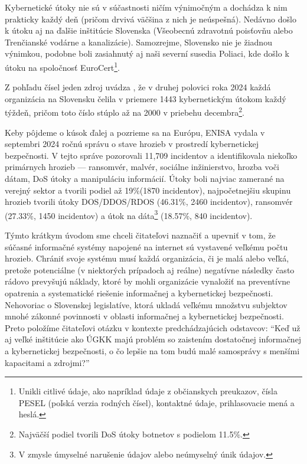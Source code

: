 Kybernetické útoky nie sú v súčastnosti ničím výnimočným a dochádza k nim prakticky každý deň (pričom drvivá väčšina z nich je neúspešná). Nedávno došlo k
útoku aj na ďalšie inštitúcie Slovenska (Všeobecnú zdravotnú poisťovňu\cite{utok_na_vszp_zive} alebo Trenčianské vodárne a kanalizácie\cite{utok_na_trencin_zive}).
Samozrejme, Slovensko nie je žiadnou výnimkou, podobne boli zasiahnutý aj naši severní susedia Poliaci, kde došlo k útoku na spoločnosť
EuroCert\cite{utok_na_polsko_zive}\cite{utok_na_polsko_eurocert}\footnote{Unikli citlivé údaje, ako napríklad údaje z občianskych preukazov, čísla PESEL
(poľská verzia rodných čísel), kontaktné údaje, prihlasovacie mená a heslá.}.

Z pohľadu čísel jeden zdroj uvádza \cite{pocet_kyberutokov_na_slovensku}, že v druhej polovici roka 2024 každá organizácia na Slovensku čelila v priemere
1443 kybernetickým útokom každý týždeň, pričom toto číslo stúplo až na 2000 v priebehu decembra\footnote{Najväčší podiel tvorili DoS útoky botnetov s
podielom 11.5\%.}. 

Keby pôjdeme o kúsok ďalej a pozrieme sa na Európu, ENISA vydala v septembri 2024 ročnú správu o stave hrozieb v prostredí kybernetickej
bezpečnosti\cite{enisa_cybersecurity_threat_landscape_2024}. V tejto správe pozorovali 11,709 incidentov a identifikovala niekoľko primárnych hrozieb ---
ransomvér, malvér, sociálne inžinierstvo, hrozba voči dátam, DoS útoky a manipuláciu informácií. Útoky boli najviac zamerané na verejný sektor a tvorili
podiel až 19\%(1870 incidentov), najpočetnejšiu skupinu hrozieb tvorili útoky DOS/DDOS/RDOS (46.31\%, 2460 incidentov), ransomvér (27.33\%, 1450 incidentov)
a útok na dáta\footnote{V zmysle úmyselné narušenie údajov alebo neúmyselný únik údajov.} (18.57\%, 840 incidentov).

Týmto krátkym úvodom sme chceli čitateľovi naznačiť a upevniť v tom, že súčasné informačné systémy napojené na internet sú vystavené veľkému počtu hrozieb.
Chrániť svoje systému musí každá organizácia, či je malá alebo veľká, pretože potenciálne (v niektorých prípadoch aj reálne) negatívne následky často
rádovo prevyšujú náklady, ktoré by mohli organizácie vynaložiť na preventívne opatrenia a systematické riešenie informačnej a kybernetickej bezpečnosti.
Nehovoriac o Slovenskej legislatíve, ktorá ukladá veľkému množstvu subjektov mnohé zákonné povinnosti v oblasti informačnej a kybernetickej bezpečnosti.
Preto položíme čitateľovi otázku v kontexte predchádzajúcich odstavcov: \enquote{Keď už aj veľké inštitúcie ako ÚGKK majú problém so zaistením dostatočnej
informačnej a kybernetickej bezpečnosti, o čo lepšie na tom budú malé samosprávy s menšími kapacitami a zdrojmi?}

